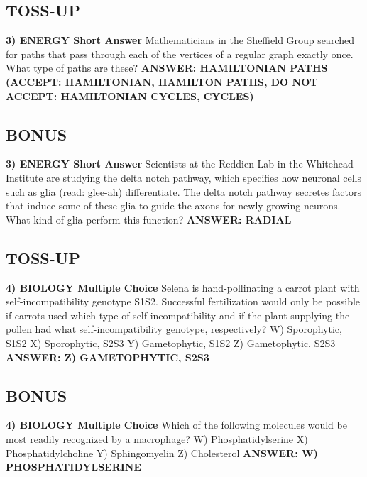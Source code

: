 \documentclass{article}
\begin{document}
\subsection*{TOSS-UP}
\textbf{3) ENERGY Short Answer} Mathematicians in the Sheffield Group searched for paths that pass through each of the vertices of a regular graph exactly once. What type of paths are these?
\newline
\textbf{ANSWER: HAMILTONIAN PATHS (ACCEPT: HAMILTONIAN, HAMILTON PATHS, DO NOT ACCEPT: HAMILTONIAN CYCLES, CYCLES)}

\subsection*{BONUS}
\textbf{3) ENERGY Short Answer} Scientists at the Reddien Lab in the Whitehead Institute are studying the delta notch pathway, which specifies how neuronal cells such as glia (read: glee-ah) differentiate. The delta notch pathway secretes factors that induce some of these glia to guide the axons for newly growing neurons. What kind of glia perform this function?
\newline
\textbf{ANSWER: RADIAL}

\subsection*{TOSS-UP}
\textbf{4) BIOLOGY Multiple Choice} Selena is hand-pollinating a carrot plant with self-incompatibility genotype S1S2. Successful fertilization would only be possible if carrots used which type of self-incompatibility and if the plant supplying the pollen had what self-incompatibility genotype, respectively?
\newline
W) Sporophytic, S1S2
\newline
X) Sporophytic, S2S3
\newline
Y) Gametophytic, S1S2
\newline
Z) Gametophytic, S2S3
\newline
\textbf{ANSWER: Z) GAMETOPHYTIC, S2S3}

\subsection*{BONUS}
\textbf{4) BIOLOGY Multiple Choice} Which of the following molecules would be most readily recognized by a macrophage?
\newline
W) Phosphatidylserine
\newline
X) Phosphatidylcholine
\newline
Y) Sphingomyelin
\newline
Z) Cholesterol
\newline
\textbf{ANSWER: W) PHOSPHATIDYLSERINE}
\end{document}
